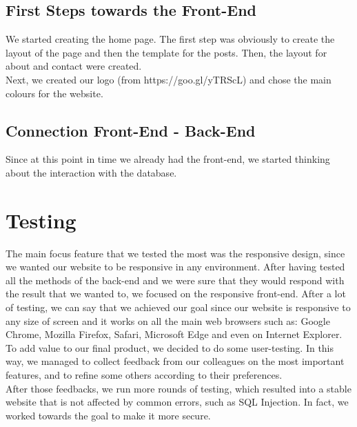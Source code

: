 \documentclass[a4paper]{article}
\begin{document}
	\subsection{First Steps towards the Front-End}
	We started creating the home page. The first step was obviously to create the layout of the page and then the template for the posts. Then, the layout for about and contact were created.\\
	Next, we created our logo (from https://goo.gl/yTRScL) and chose the main colours for the website.
	
	\subsection{Connection Front-End - Back-End}
	Since at this point in time we already had the front-end, we started thinking about the interaction with the database. 
	
	\section{Testing}
	The main focus feature that we tested the most was the responsive design, since we wanted our website to be responsive in any environment. After having tested all the methods of the back-end and we were sure that they would respond with the result that we wanted to, we focused on the responsive front-end. After a lot of testing, we can say that we achieved our goal since our website is responsive to any size of screen and it works on all the main web browsers such as: Google Chrome, Mozilla Firefox, Safari, Microsoft Edge and even on Internet Explorer.\\
	To add value to our final product, we decided to do some user-testing. In this way, we managed to collect feedback from our colleagues on the most important features, and to refine some others according to their preferences.\\
	After those feedbacks, we run more rounds of testing, which resulted into a stable website that is not affected by common errors, such as SQL Injection. In fact, we worked towards the goal to make it more secure.\\
	
\end{document}
